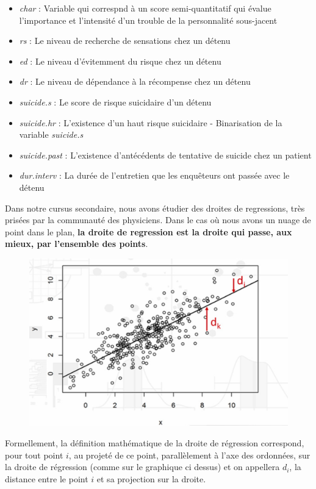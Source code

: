 \begin{itemize}
\item \textit{char} : Variable qui correspnd à un score semi-quantitatif qui évalue l'importance et l'intensité d'un trouble de la personnalité sous-jacent 
\item \textit{rs} : Le niveau de recherche de sensations chez un détenu
\item \textit{ed} : Le niveau d'évitemment du risque chez un détenu
\item \textit{dr} : Le niveau de dépendance à la récompense chez un détenu
\item \textit{suicide.s} : Le score de risque suicidaire d'un détenu
\item \textit{suicide.hr} : L'existence d'un haut risque suicidaire - Binarisation de la variable \textit{suicide.s} 
\item \textit{suicide.past} : L'existence d'antécédents de tentative de suicide chez un patient 
\item \textit{dur.interv} : La durée de l'entretien que les enquêteurs ont passée avec le détenu 
\end{itemize}
Dans notre cursus secondaire, nous avons étudier des droites de regressions, très prisées par la communauté des physiciens.\newline
Dans le cas où nous avons un nuage de point dans le plan, \textbf{la droite de regression est la droite qui passe, aux mieux, par l'ensemble des points}.
\begin{figure}[H]\begin{center}\includegraphics[scale=0.7]{ilu/cl.png}\end{center}\end{figure}
Formellement, la définition mathématique de la droite de régression correspond, pour tout point $i$, au projeté de ce point, parallèlement à l'axe des ordonnées, sur la droite de régression (comme sur le graphique ci dessus) et on appellera $d_{i}$, la distance entre le point $i$ et sa projection sur la droite.\newline
